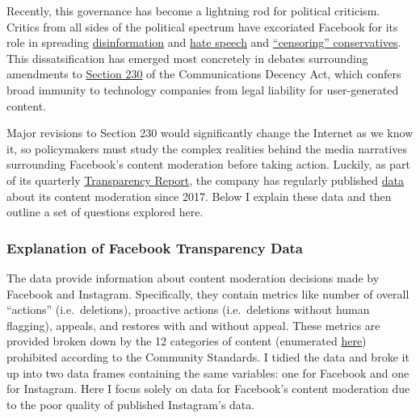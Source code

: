 \documentclass[
]{article}
\begin{document}
Recently, this governance has become a lightning rod for political
criticism. Critics from all sides of the political spectrum have
excoriated Facebook for its role in spreading
\href{https://www.npr.org/2021/03/06/974394783/far-right-misinformation-is-thriving-on-facebook-a-new-study-shows-just-how-much}{disinformation}
and \href{https://news.un.org/en/story/2020/12/1080832}{hate speech} and
\href{https://www.npr.org/2020/11/14/934833214/conservatives-flock-to-mercer-funded-parler-claim-censorship-on-facebook-and-twi}{``censoring''
conservatives}. This dissatsification has emerged most concretely in
debates surrounding amendments to
\href{https://www.businessinsider.com/what-is-section-230-internet-law-communications-decency-act-explained-2020-5}{Section
230} of the Communications Decency Act, which confers broad immunity to
technology companies from legal liability for user-generated content.

Major revisions to Section 230 would significantly change the Internet
as we know it, so policymakers must study the complex realities behind
the media narratives surrounding Facebook's content moderation before
taking action. Luckily, as part of its quarterly
\href{https://transparency.fb.com/data/}{Transparency Report}, the
company has regularly published
\href{https://transparency.fb.com/data/community-standards-enforcement}{data}
about its content moderation since 2017. Below I explain these data and
then outline a set of questions explored here.

\hypertarget{explanation-of-facebook-transparency-data}{%
\subsubsection{Explanation of Facebook Transparency
Data}\label{explanation-of-facebook-transparency-data}}

The data provide information about content moderation decisions made by
Facebook and Instagram. Specifically, they contain metrics like number
of overall ``actions'' (i.e.~deletions), proactive actions
(i.e.~deletions without human flagging), appeals, and restores with and
without appeal. These metrics are provided broken down by the 12
categories of content (enumerated
\href{https://transparency.fb.com/policies/}{here}) prohibited according
to the Community Standards. I tidied the data and broke it up into two
data frames containing the same variables: one for Facebook and one for
Instagram. Here I focus solely on data for Facebook's content moderation
due to the poor quality of published Instagram's data.
\end{document}
